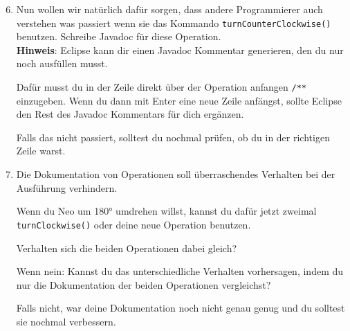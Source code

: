 \begin{enumerate}\setcounter{enumi}{5}
    \item Nun wollen wir natürlich dafür sorgen, dass andere Programmierer auch verstehen was passiert wenn sie das Kommando \lstinline{turnCounterClockwise()} benutzen.
        Schreibe Javadoc für diese Operation.\\

    \textbf{Hinweis}: Eclipse kann dir einen Javadoc Kommentar generieren, den du nur noch ausfüllen musst.

        Dafür musst du in der Zeile direkt über der Operation anfangen \lstinline{/**} einzugeben.
        Wenn du dann mit Enter eine neue Zeile anfängst, sollte Eclipse den Rest des Javadoc Kommentars für dich ergänzen.

        Falls das nicht passiert, solltest du nochmal prüfen, ob du in der richtigen Zeile warst.

    \item Die Dokumentation von Operationen soll überraschendes Verhalten bei der Ausführung verhindern.

        Wenn du Neo um 180° umdrehen willst, kannst du dafür jetzt zweimal \lstinline{turnClockwise()} oder deine neue Operation benutzen.

        Verhalten sich die beiden Operationen dabei gleich?

        Wenn nein: Kannst du das unterschiedliche Verhalten vorhersagen, indem du nur die Dokumentation der beiden Operationen vergleichst?

        Falls nicht, war deine Dokumentation noch nicht genau genug und du solltest sie nochmal verbessern.
\end{enumerate}


